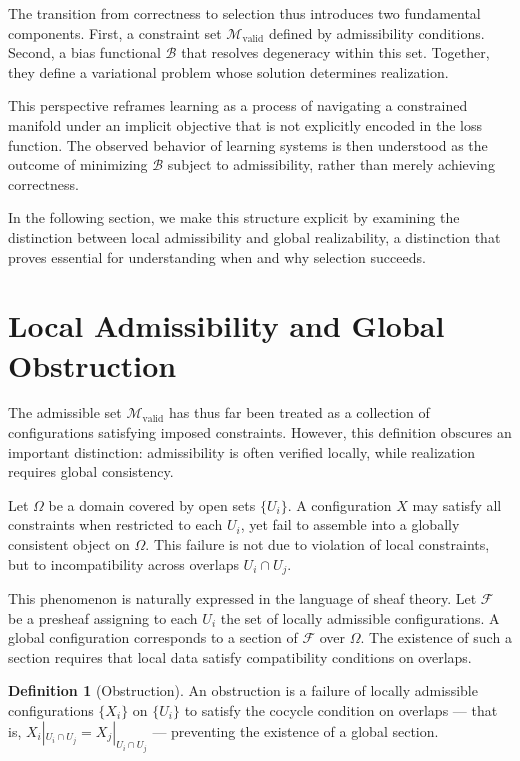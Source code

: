 \documentclass[11pt]{article}
\theoremstyle{plain}
\theoremstyle{definition}
\newtheorem{definition}[theorem]{Definition}
\theoremstyle{remark}
\begin{document}
The transition from correctness to selection thus introduces two fundamental components. First, a constraint set $\mathcal{M}_{\mathrm{valid}}$ defined by admissibility conditions. Second, a bias functional $\mathcal{B}$ that resolves degeneracy within this set. Together, they define a variational problem whose solution determines realization.

This perspective reframes learning as a process of navigating a constrained manifold under an implicit objective that is not explicitly encoded in the loss function. The observed behavior of learning systems is then understood as the outcome of minimizing $\mathcal{B}$ subject to admissibility, rather than merely achieving correctness.

In the following section, we make this structure explicit by examining the distinction between local admissibility and global realizability, a distinction that proves essential for understanding when and why selection succeeds.

\section{Local Admissibility and Global Obstruction}

The admissible set $\mathcal{M}_{\mathrm{valid}}$ has thus far been treated as a collection of configurations satisfying imposed constraints. However, this definition obscures an important distinction: admissibility is often verified locally, while realization requires global consistency.

Let $\Omega$ be a domain covered by open sets $\{U_i\}$. A configuration $X$ may satisfy all constraints when restricted to each $U_i$, yet fail to assemble into a globally consistent object on $\Omega$. This failure is not due to violation of local constraints, but to incompatibility across overlaps $U_i \cap U_j$.

This phenomenon is naturally expressed in the language of sheaf theory. Let $\mathcal{F}$ be a presheaf assigning to each $U_i$ the set of locally admissible configurations. A global configuration corresponds to a section of $\mathcal{F}$ over $\Omega$. The existence of such a section requires that local data satisfy compatibility conditions on overlaps.

\begin{definition}[Obstruction]
An obstruction is a failure of locally admissible configurations $\{X_i\}$ on $\{U_i\}$ to satisfy the cocycle condition on overlaps --- that is, $X_i|_{U_i \cap U_j} = X_j|_{U_i \cap U_j}$ --- preventing the existence of a global section.
\end{definition}
\end{document}
